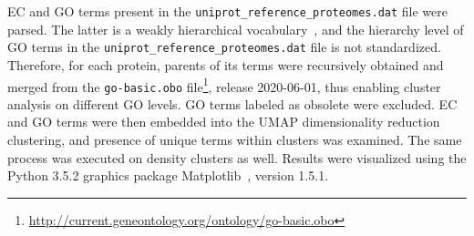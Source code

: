 EC and GO terms present in the \texttt{uniprot\_reference\_proteomes.dat} file were
parsed.
The latter is a weakly hierarchical vocabulary~\cite{ashburner2000gene}, and the hierarchy
level of GO terms in the \texttt{uniprot\_reference\_proteomes.dat} file is not
standardized.
Therefore, for each protein, parents of its terms were recursively obtained and merged
from the \texttt{go-basic.obo}
file\footnote{\url{http://current.geneontology.org/ontology/go-basic.obo}}, release
2020-06-01, thus enabling cluster analysis on different GO levels.
GO terms labeled as obsolete were excluded.
EC and GO terms were then embedded into the UMAP dimensionality reduction clustering, and
presence of unique terms within clusters was examined.
The same process was executed on density clusters as well.
Results were visualized using the Python 3.5.2 graphics package
Matplotlib~\cite{hunter2007matplotlib}, version 1.5.1.


